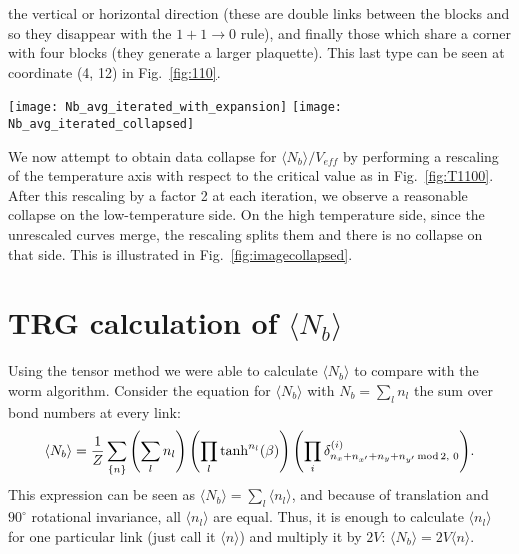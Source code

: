 \documentclass[../main.tex]{subfiles}
\begin{document}
the vertical or horizontal direction (these are double links between the blocks
and so they disappear with the $1+1\rightarrow0$ rule), and finally those which
share a corner with four blocks (they generate a larger plaquette).
%
This last type can be seen at coordinate (4, 12) in Fig.~\ref{fig:110}.
%
\begin{figure*}[htpb]
    \centering 
    \texttt{[image: Nb\_avg\_iterated\_with\_expansion]}\hfill%
    \texttt{[image: Nb\_avg\_iterated\_collapsed]}
    \caption{(a) Average number of bonds $\langle N_b\rangle$ vs.\ temperature
      $T$ under iterated blocking steps beginning with an initial lattice size
      of $L = 64$. The dashed black line illustrates the high temperature
      expansion, showing that the dominant configurations are those consisting
      of small, isolated plaquettes. (b) Average number of bonds $\langle
      N_b\rangle$ vs.\ the rescaled temperature $(T - 2.269) /
      L_{\mathrm{eff}}$ under successive blocking steps. Iteration 0 represents
      the original lattice before blocking, with $L_{\mathrm{eff}} = 64$. }%
\label{fig:imagecollapsed}
\end{figure*}
%
We now attempt to obtain data collapse for $\langle N_b \rangle/V_{eff}$ by
performing a rescaling of the temperature axis with respect to the critical
value as in Fig.~\ref{fig:T1100}.
%
After this rescaling by a factor 2 at each iteration, we observe a reasonable
collapse on the low-temperature side.
%
On the high temperature side, since the unrescaled curves merge, the rescaling
splits them and there is no collapse on that side.
%
This is illustrated in Fig.~\ref{fig:imagecollapsed}.  

\section{TRG calculation of \texorpdfstring{$\langle N_b \rangle$}{<Nb>}}%
\label{sec:nbtrg}
Using the tensor method we were able to calculate $\langle N_{b} \rangle$ to
compare with the worm algorithm.
%
Consider the equation for $\langle N_{b} \rangle$ with $N_{b} = \sum_{l} n_{l}$
the sum over bond numbers at every link:
%
\begin{equation}
    \langle N_{b} \rangle = \frac{1}{Z} \sum_{\{n\}} \left( \sum_{l} n_{l}
    \right) \left( \prod_{l} \tanh^{n_{l}}(\beta) \right){\left(
    \prod_{i}
    \delta^{(i)}_{n_{x}+n_{{x^{\prime}}}+n_{y}+n_{{y^{\prime}}}\,\mathrm{mod}\,2,\,\,0}\right)}.
\end{equation}
%
This expression can be seen as $\langle N_{b} \rangle = \sum_{l} \langle n_{l}
\rangle$, and because of translation and $90^{\circ}$ rotational invariance,
all $\langle n_{l} \rangle$ are equal.
%
Thus, it is enough to calculate
$\langle n_{l} \rangle$ for one particular link (just call it $\langle
n\rangle$) and multiply it by $2V$: $\langle N_{b} \rangle = 2V \langle n
\rangle$.
\end{document}
